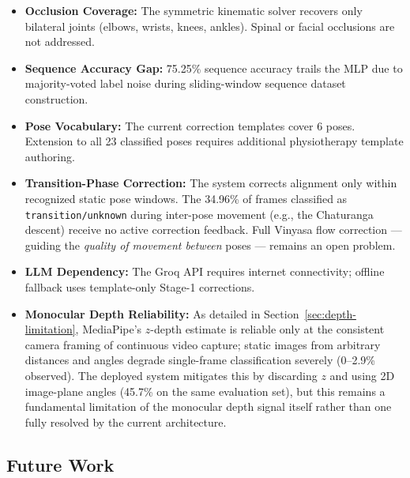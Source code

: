 \documentclass[conference]{IEEEtran}
\begin{document}
\begin{itemize}
\item \textbf{Occlusion Coverage:} The symmetric kinematic solver recovers only bilateral
  joints (elbows, wrists, knees, ankles). Spinal or facial occlusions are not addressed.
\item \textbf{Sequence Accuracy Gap:} 75.25\% sequence accuracy trails the MLP due to
  majority-voted label noise during sliding-window sequence dataset construction.
\item \textbf{Pose Vocabulary:} The current correction templates cover 6 poses. Extension
  to all 23 classified poses requires additional physiotherapy template authoring.
\item \textbf{Transition-Phase Correction:} The system corrects alignment only within
  recognized static pose windows. The 34.96\% of frames classified as
  \texttt{transition/unknown} during inter-pose movement (e.g., the Chaturanga
  descent) receive no active correction feedback. Full Vinyasa flow correction
  --- guiding the \emph{quality of movement between} poses --- remains an open problem.
\item \textbf{LLM Dependency:} The Groq API requires internet connectivity; offline
  fallback uses template-only Stage-1 corrections.
\item \textbf{Monocular Depth Reliability:} As detailed in
  Section~\ref{sec:depth-limitation}, MediaPipe's $z$-depth estimate is reliable only
  at the consistent camera framing of continuous video capture; static images from
  arbitrary distances and angles degrade single-frame classification severely
  (0--2.9\% observed). The deployed system mitigates this by discarding $z$ and
  using 2D image-plane angles (45.7\% on the same evaluation set), but this remains
  a fundamental limitation of the monocular depth signal itself rather than one fully
  resolved by the current architecture.
\end{itemize}

\subsection{Future Work}
\label{sec:future}
\end{document}

